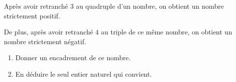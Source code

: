 \begin{exo}{}
	Après avoir retranché $3$ au quadruple d'un nombre, on obtient un nombre strictement positif.

	De plus, après avoir retranché $4$ au triple de ce même nombre, on obtient un nombre strictement négatif.
	\begin{enumerate}
		\item Donner un encadrement de ce nombre.
		\item En déduire le seul entier naturel qui convient.
	\end{enumerate}
\end{exo}
